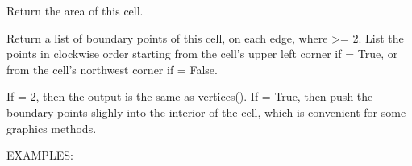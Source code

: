 \documentclass[a4paper,12ptopenany,oneside,english]{sphinxmanual}
\begin{document}
\begin{fulllineitems}
\begin{fulllineitems}
\label{\detokenize{dggs:rhealpixdggs.dggs.Cell.area}}
\pysigstartsignatures
{}
\pysigstopsignatures
\sphinxAtStartPar
Return the area of this cell.

\end{fulllineitems}


\begin{fulllineitems}
\label{\detokenize{dggs:rhealpixdggs.dggs.Cell.boundary}}
\pysigstartsignatures
{}
\pysigstopsignatures
\sphinxAtStartPar
Return a list of  boundary points of this cell,
 on each edge, where  \textgreater{}= 2.
List the points in clockwise order starting from the cell’s upper left
corner if  = True, or from the cell’s northwest corner
if  = False.

\sphinxAtStartPar
If  = 2, then the output is the same as vertices().
If  = True, then push the boundary points slighly into the
interior of the cell, which is convenient for some graphics methods.

\sphinxAtStartPar
EXAMPLES:


\end{fulllineitems}
\end{fulllineitems}
\end{document}

